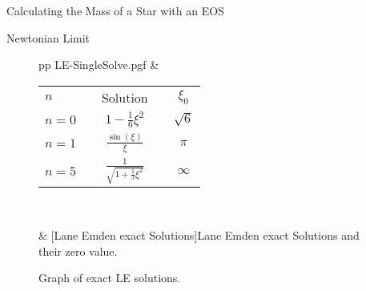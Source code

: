 \begin{section}{Calculating the Mass of a Star with an EOS}
\begin{subsection}{Newtonian Limit}
\begin{figure}[H]
	\centering
	\begin{tabular}{p{\dimexpr 8cm}p{\dimexpr {}\tabcolsep-8cm}}
		{LE-SingleSolve.pgf}
		&
		\renewcommand{\arraystretch}{1.2}
		\begin{tabular}[b]{@{}lcccc@{}}
			\toprule
			$n$ & \phantom{abcd} & Solution & \phantom{abcd} & $\xi_0$\\
			\cmidrule{1-5}
			$n=0$ && $\displaystyle 1-\frac{1}{6}\xi^2$ && $\sqrt{6}$\\[3ex]
			$n=1$ && $\displaystyle \frac{\sin(\xi)}{\xi}$ && $\pi$\\[3ex]
			$n=5$ && $\displaystyle \frac{1}{\sqrt{1+\frac{1}{3}\xi^2}}$ && $\infty$\\[2ex]
			\bottomrule
		\end{tabular}\\
		\caption[Lane Emden exact Solutions]{Graph of exact LE solutions.}
		\label{3-Mass-LE-Exact-Results-Plots}
		&
		[Lane Emden exact Solutions]{Lane Emden exact Solutions and their zero value.}
		\label{3-Mass-LE-Exact-Results}
	\end{tabular}
\end{figure}


\end{subsection}
\end{section}
